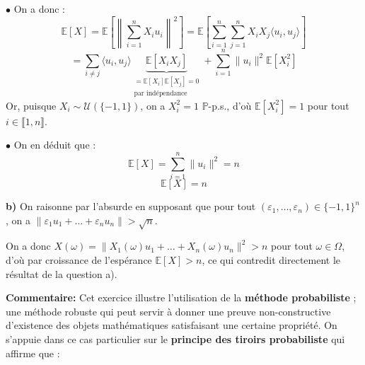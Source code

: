 \documentclass[11pt,a4paper]{article}
\begin{document}
\vspace{0.3cm}
\noindent $\bullet$ On a donc :
$$ \mathbb{E}[X] = \mathbb{E}\left[ \left\| \sum_{i=1}^n X_i u_i \right\|^2 \right] = \mathbb{E}\left[ \sum_{i=1}^n \sum_{j=1}^n X_i X_j \langle u_i, u_j \rangle \right] $$
$$ = \sum_{i \neq j} \langle u_i, u_j \rangle \underbrace{\mathbb{E}[X_i X_j]}_{\substack{= \mathbb{E}[X_i]\mathbb{E}[X_j] = 0 \\ \text{par indépendance}}} + \sum_{i=1}^n \|u_i\|^2 \mathbb{E}[X_i^2] $$
\noindent Or, puisque $X_i \sim \mathcal{U}(\{-1, 1\})$, on a $X_i^2 = 1$ $\mathbb{P}$-p.s., d'où $\mathbb{E}[X_i^2] = 1$ pour tout $i \in \llbracket 1, n \rrbracket$.

\vspace{0.3cm}
\noindent $\bullet$ On en déduit que :
$$ \mathbb{E}[X] = \sum_{i=1}^n \|u_i\|^2 = n $$
$$ \boxed{\mathbb{E}[X] = n} $$
\vspace{0.5cm}

\noindent \textbf{b)} On raisonne par l'absurde en supposant que pour tout $(\varepsilon_1, \dots, \varepsilon_n) \in \{-1, 1\}^n$, on a $\|\varepsilon_1 u_1 + \dots + \varepsilon_n u_n\| > \sqrt{n}$.

\noindent On a donc $X(\omega) = \|X_1(\omega)u_1 + \dots + X_n(\omega)u_n\|^2 > n$ pour tout $\omega \in \Omega$, d'où par croissance de l'espérance $\mathbb{E}[X] > n$, ce qui contredit directement le résultat de la question a).

\begin{center}
\end{center}
\begin{commentaire}
\textbf{Commentaire:} Cet exercice illustre l'utilisation de la \textbf{méthode probabiliste} ; une méthode robuste qui peut servir à donner une preuve non-constructive d'existence des objets mathématiques satisfaisant une certaine propriété. On s'appuie dans ce cas particulier sur le \textbf{principe des tiroirs probabiliste} qui affirme que :
\begin{center}
\end{center}
\end{commentaire}
\end{document}
